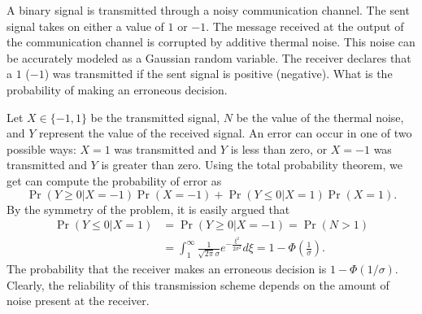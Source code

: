 \begin{example} \label{example:NoiseCommunicationSystem1}
A binary signal is transmitted through a noisy communication channel.
The sent signal takes on either a value of $1$ or $-1$.
The message received at the output of the communication channel is corrupted by additive thermal noise.
This noise can be accurately modeled as a Gaussian random variable.
The receiver declares that a $1$ ($-1$) was transmitted if the sent signal is positive (negative).
What is the probability of making an erroneous decision.

Let $X \in \{ -1, 1 \}$ be the transmitted signal, $N$ be the value of the thermal noise, and $Y$ represent the value of the received signal.
An error can occur in one of two possible ways: $X = 1$ was transmitted and $Y$ is less than zero, or $X = -1$ was transmitted and $Y$ is greater than zero.
Using the total probability theorem, we get can compute the probability of error as
\begin{equation*}
\Pr (Y \geq 0 | X = -1) \Pr (X = -1)
+ \Pr (Y \leq 0 | X = 1) \Pr (X = 1).
\end{equation*}
By the symmetry of the problem, it is easily argued that
\begin{equation*}
\begin{split}
\Pr (Y \leq 0 | X = 1) &= \Pr (Y \geq 0 | X = -1) = \Pr (N > 1) \\
&= \int_{1}^{\infty} \frac{1}{\sqrt{2 \pi} \sigma}
e^{- \frac{\xi^2}{2 \sigma^2}} d\xi
= 1 - \Phi \left( \frac{1}{\sigma} \right) .
\end{split}
\end{equation*}
The probability that the receiver makes an erroneous decision is $1 - \Phi (1/\sigma)$.
Clearly, the reliability of this transmission scheme depends on the amount of noise present at the receiver.
\end{example}

